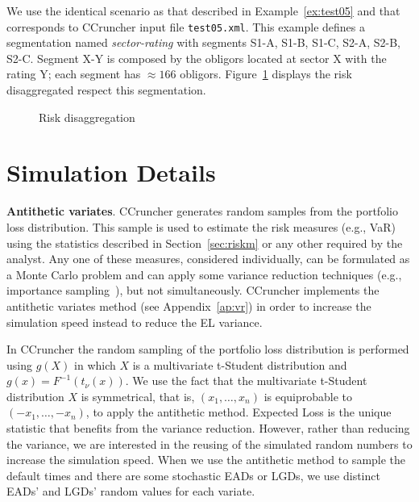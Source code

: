 \documentclass[11pt,fleqn]{book} %
\begin{document}
\begin{example}
	We use the identical scenario as that described in Example~\ref{ex:test05} 
	and that corresponds to CCruncher input file \texttt{test05.xml}. This 
	example defines a segmentation named \emph{sector-rating} with segments 
	S1-A, S1-B, S1-C, S2-A, S2-B, S2-C. Segment X-Y is composed by the obligors 
	located at sector X with the rating Y; each segment has $\approx 166$ 
	obligors. Figure~\ref{fig:disaggregation} displays the risk disaggregated 
	respect this segmentation.
\end{example}

\begin{figure}[!ht]
	\centering
	\caption{Risk disaggregation}
	\label{fig:disaggregation} 
\end{figure}

\section{Simulation Details}

\textbf{Antithetic variates}. CCruncher generates random samples from the 
portfolio loss distribution. This sample is used to estimate the risk measures 
(e.g., VaR) using the statistics described in Section~\ref{sec:riskm} or any 
other required by the analyst. Any one of these measures, considered 
individually, can be formulated as a Monte Carlo problem and can apply some 
variance reduction techniques (e.g., importance sampling~\cite{brereton:2012}), 
but not simultaneously. CCruncher implements the antithetic variates method
(see Appendix~\ref{ap:vr}) in order to increase the simulation speed instead
to reduce the EL variance.

In CCruncher the random sampling of the portfolio loss distribution is 
performed using $g(X)$ in which $X$ is a multivariate t-Student distribution 
and $g(x) = F^{-1}(t_{\nu}(x))$. We use the fact that the multivariate 
t-Student distribution $X$ is symmetrical, that is, $(x_1,\dots,x_n)$ is 
equiprobable to $(-x_1,\dots,-x_n)$, to apply the antithetic method. 
Expected Loss is the unique statistic that benefits from the variance 
reduction. However, rather than reducing the variance, we are interested 
in the reusing of the simulated random numbers to increase the simulation 
speed. When we use the antithetic method to sample the default times and 
there are some stochastic EADs or LGDs, we use distinct EADs' and LGDs' 
random values for each variate.
\end{document}
